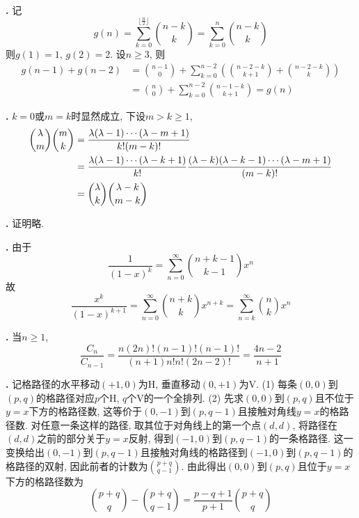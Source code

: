 \par \textbf{\thesolenum .} \cite{IC} 记\begin{equation*}
    g(n)=\sum_{k=0}^{\lfloor\frac{n}{2}\rfloor} \binom{n-k}{k}=\sum_{k=0}^{n} \binom{n-k}{k}
\end{equation*}
则$g(1)=1$, $g(2)=2$. 设$n\ge 3$, 则
\begin{align*}
    g(n-1)+g(n-2) &= \binom{n-1}{0} +\sum_{k=0}^{n-2} \left(\binom{n-2-k}{k+1} + \binom{n-2-k}{k}\right)\\
    &= \binom{n}{0} + \sum_{k=0}^{n-2} \binom{n-1-k}{k+1} = g(n)
\end{align*}

\par \textbf{\thesolenum .}  $k=0$或$m=k$时显然成立, 下设$m>k\ge 1$, 
\begin{align*}
\binom{\lambda}{m}\binom{m}{k}
&=\frac{\lambda(\lambda-1)\cdots(\lambda-m+1)}{k!(m-k)!}\notag\\
&=\frac{\lambda(\lambda-1)\cdots(\lambda-k+1)}{k!}\frac{(\lambda-k)(\lambda-k-1)\cdots(\lambda-m+1)}{(m-k)!}\notag\\
&=\binom{\lambda}{k}\binom{\lambda-k}{m-k}
\end{align*}

\par \textbf{\thesolenum .} 证明略. 

\par \textbf{\thesolenum .} 由于
\begin{equation*}
    \frac{1}{(1-x)^{k}} =\sum_{n=0}^\infty \binom{n+k-1}{k-1} x^{n}
\end{equation*}
故
\begin{equation*}
    \frac{x^k}{(1-x)^{k+1}} =\sum_{n=0}^\infty \binom{n+k}{k} x^{n+k} = \sum_{n=k}^\infty \binom{n}{k} x^n
\end{equation*}

\par \textbf{\thesolenum .} \cite{IC} 当$n\ge 1$, 
\begin{equation*}
    \frac{C_n}{C_{n-1}} = \frac{n (2n)!(n-1)!(n-1)!}{(n+1)n!n!(2n-2)!} = \frac{ 4n-2}{n+1}
\end{equation*}

\par \textbf{\thesolenum .} \cite{IC} 记格路径的水平移动$(+1,0)$为H, 垂直移动$(0, +1)$为V. (1) 每条$(0,0)$到$(p,q)$的格路径对应$p$个H, $q$个V的一个全排列. (2) 先求$(0,0)$到$(p,q)$且不位于$y=x$下方的格路径数, 这等价于$(0,-1)$到$(p,q-1)$且接触对角线$y=x$的格路径数. 对任意一条这样的路径, 取其位于对角线上的第一个点$(d,d)$, 将路径在$(d,d)$之前的部分关于$y=x$反射, 得到$(-1,0)$到$(p,q-1)$的一条格路径. 这一变换给出$(0,-1)$到$(p,q-1)$且接触对角线的格路径到$(-1,0)$到$(p,q-1)$的格路径的双射, 因此前者的计数为$\binom{p+q}{q-1}$. 由此得出$(0,0)$到$(p,q)$且位于$y=x$下方的格路径数为
\begin{equation*}
    \binom{p+q}{q}-\binom{p+q}{q-1}=\frac{p-q+1}{p+1}\binom{p+q}{q}
\end{equation*}

